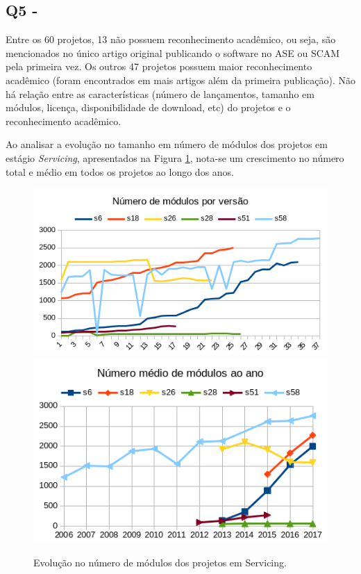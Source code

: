\subsection{Q5 - \QuestaoCinco} %

Entre os 60 projetos, 13 não possuem reconhecimento acadêmico, ou seja, são
mencionados no único artigo original publicando o software no ASE ou SCAM pela
primeira vez. Os outros 47 projetos possuem maior reconhecimento acadêmico
(foram encontrados em mais artigos além da primeira publicação). Não há relação
entre as características (número de lançamentos, tamanho em módulos, licença,
disponibilidade de download, etc) do projetos e o reconhecimento acadêmico.


Ao analisar a evolução no tamanho em número de módulos dos projetos em estágio
{\it Servicing}, apresentados na Figura \ref{modules-evolution-servicing},
nota-se um crescimento no número total e médio em todos os projetos ao longo
dos anos.


\begin{figure}[h]
  \center
  \includegraphics[scale=0.6]{imagens/modules-evolution-servicing.png}
  \includegraphics[scale=0.6]{imagens/modules-evolution-average.png}
  \caption{Evolução no número de módulos dos projetos em Servicing.}
  \label{modules-evolution-servicing}
\end{figure}

